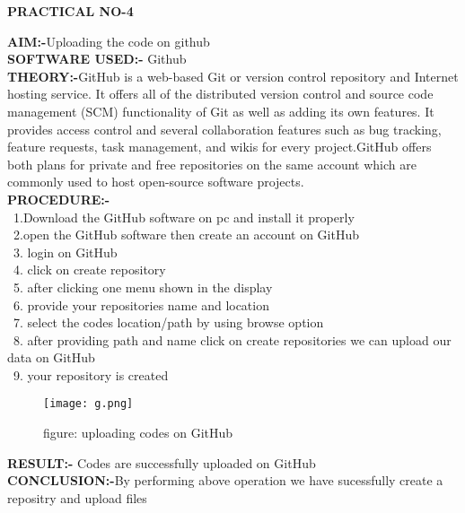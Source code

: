 \documentclass[a4paper,0pt]{article}
\begin{document}
\begin{center}
\textbf{\LARGE PRACTICAL NO-4}\\[1cm]
\end{center}
\textbf{AIM:-}Uploading the code on github\\[5mm]
\textbf{SOFTWARE USED:-} Github\\[5mm]
\textbf{THEORY:-}GitHub is a web-based Git or version control repository and Internet hosting service. It offers all of the distributed version control and source code management (SCM) functionality of Git as well as adding its own features. It provides access control and several collaboration features such as bug tracking, feature requests, task management, and wikis for every project.GitHub offers both plans for private and free repositories on the same account which are commonly used to host open-source software projects.\\[5MM]
\textbf{PROCEDURE:-}\\[2mm]
\ 1.Download the GitHub software on pc and install it properly \\[2mm]
\ 2.open the  GitHub software then  create an account on GitHub \\[2mm]
\ 3. login on GitHub \\[2mm]
\ 4.  click on create repository \\[2mm]
\ 5. after clicking one menu shown in the display \\[2mm]
\ 6.  provide your repositories name and location \\[2mm]
\ 7. select the codes location/path  by using browse option  \\[2mm] 
\ 8. after providing path and name click on create repositories we can upload our data on GitHub\\[2mm]
\ 9. your repository is created \\[2mm]
\begin{figure}[h!]
\centering
\texttt{[image: g.png]}
\caption{figure: uploading codes on GitHub}
\end{figure}
\textbf{RESULT:-} Codes are successfully uploaded on GitHub \\[5mm]
\textbf{CONCLUSION:-}By performing above operation we have sucessfully create a repositry and upload files\\[2MM]
\end{document}
